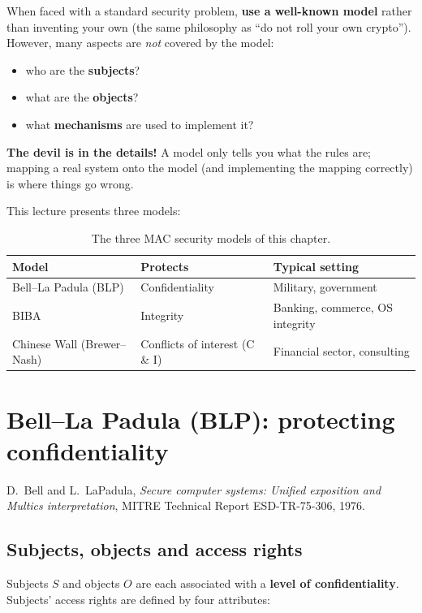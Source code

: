 When faced with a standard security problem, \textbf{use a well-known model} rather than inventing your own (the same philosophy as ``do not roll your own crypto''). However, many aspects are \emph{not} covered by the model:
\begin{itemize}
    \item who are the \textbf{subjects}?
    \item what are the \textbf{objects}?
    \item what \textbf{mechanisms} are used to implement it?
\end{itemize}
\textbf{The devil is in the details!} A model only tells you what the rules are; mapping a real system onto the model (and implementing the mapping correctly) is where things go wrong.

This lecture presents three models:
\begin{table}[h]
\centering
\begin{tabular}{@{}lll@{}}
\toprule
\textbf{Model} & \textbf{Protects} & \textbf{Typical setting} \\
\midrule
Bell--La Padula (BLP) & Confidentiality & Military, government \\
BIBA & Integrity & Banking, commerce, OS integrity \\
Chinese Wall (Brewer--Nash) & Conflicts of interest (C \& I) & Financial sector, consulting \\
\bottomrule
\end{tabular}
\caption{The three MAC security models of this chapter.}
\end{table}

\section{Bell--La Padula (BLP): protecting confidentiality}

D.\ Bell and L.\ LaPadula, \emph{Secure computer systems: Unified exposition and Multics interpretation}, MITRE Technical Report ESD-TR-75-306, 1976.

\subsection{Subjects, objects and access rights}

Subjects $S$ and objects $O$ are each associated with a \textbf{level of confidentiality}. Subjects' access rights are defined by four attributes:

